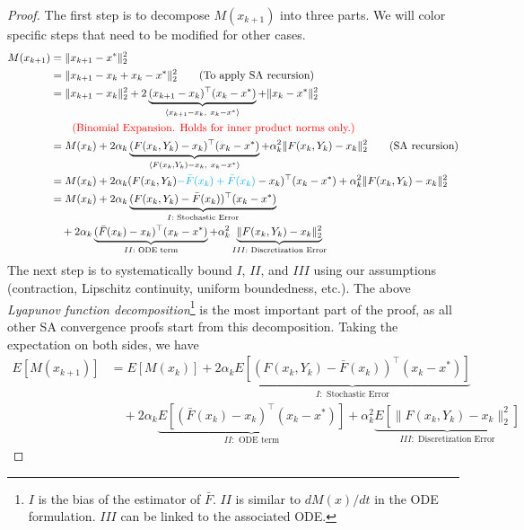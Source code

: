 \documentclass[11pt,twoside]{article}
\begin{document}
\begin{proof}
    The first step is to decompose $M(x_{k+1})$ into three parts. We will color specific steps that need to be modified for other cases.
    \begin{align*}
        M(x_{k+1}) &= \|x_{k+1}-x^*\|_2^2 \\
        &= \|x_{k+1}- x_k + x_k - x^*\|_2^2 \qquad{(\text{To apply SA recursion})} \\
        &= \|x_{k+1}- x_k\|_2^2 + 2 \underbrace{(x_{k+1}- x_k)^\top(x_k - x^*)}_{\langle x_{k+1}- x_k,~x_k - x^*\rangle} + \|x_k - x^*\|_2^2 \\
        & \qquad{\textcolor{red}{(\text{Binomial Expansion. Holds for inner product norms only.})}} \\
        &= M(x_{k}) + 2 \alpha_k \underbrace{(F(x_k,Y_k) - x_k)^\top(x_k - x^*)}_{\langle F(x_k,Y_k) - x_k,~x_k - x^*\rangle} + \alpha_k^2\| F(x_k,Y_k) - x_k\|_2^2 \qquad{(\text{SA recursion})} \\
        &= M(x_{k}) + 2 \alpha_k (F(x_k,Y_k) \textcolor{cyan}{- \bar F(x_k) + \bar F(x_k)} - x_k)^\top(x_k - x^*) + \alpha_k^2\| F(x_k,Y_k) - x_k\|_2^2 \\
        &= M(x_{k}) + 2 \alpha_k \underbrace{(F(x_k,Y_k) - \bar F(x_k))^\top(x_k - x^*)}_{I: \text{ Stochastic Error}} \\
        & \quad + 2 \alpha_k\underbrace{(\bar F(x_k)- x_k)^\top(x_k - x^*)}_{II: \text{ ODE term}} + \alpha_k^2 \underbrace{\| F(x_k,Y_k) - x_k\|_2^2}_{III: \text{ Discretization Error}} 
    \end{align*}
    The next step is to systematically bound $I$, $II$, and $III$ using our assumptions (contraction, Lipschitz continuity, uniform boundedness, etc.). The above \emph{Lyapunov function decomposition}\footnote{$I$ is the bias of the estimator of $\bar{F}$. $II$ is similar to $dM(x)/dt$ in the ODE formulation. $III$ can be linked to the associated ODE.} is the most important part of the proof, as all other SA convergence proofs start from this decomposition. Taking the expectation on both sides, we have
    \begin{align*}
        E[M(x_{k+1})] &= E[M(x_{k})] + 2 \alpha_k \underbrace{E[(F(x_k,Y_k) - \bar F(x_k))^\top(x_k - x^*)]}_{I: \text{ Stochastic Error}} \\
        & \quad + 2 \alpha_k\underbrace{E[(\bar F(x_k)- x_k)^\top(x_k - x^*)]}_{II: \text{ ODE term}} + \alpha_k^2 \underbrace{E[\| F(x_k,Y_k) - x_k\|_2^2]}_{III: \text{ Discretization Error}}  
    \end{align*}


\end{proof}
\end{document}
